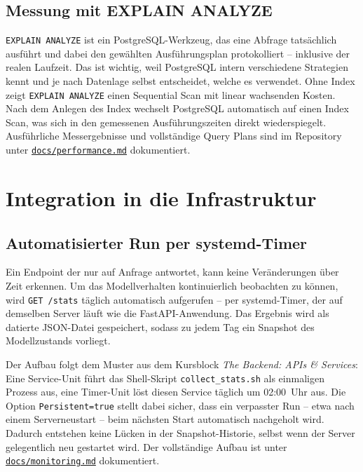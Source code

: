 \documentclass[12pt, a4paper]{article}
\newcommand{\repolink}[2]{\href{https://github.com/alinawagner1805-crypto/Full-Stack-Handwerk/#1}{#2}}
\begin{document}
\subsection{Messung mit EXPLAIN ANALYZE}

\texttt{EXPLAIN ANALYZE} ist ein PostgreSQL-Werkzeug, das eine Abfrage
tatsächlich ausführt und dabei den gewählten Ausführungsplan protokolliert
-- inklusive der realen Laufzeit. Das ist wichtig, weil PostgreSQL intern
verschiedene Strategien kennt und je nach Datenlage selbst entscheidet,
welche es verwendet. Ohne Index zeigt \texttt{EXPLAIN ANALYZE} einen
Sequential Scan mit linear wachsenden Kosten. Nach dem Anlegen des Index
wechselt PostgreSQL automatisch auf einen Index Scan, was sich in den
gemessenen Ausführungszeiten direkt wiederspiegelt. Ausführliche
Messergebnisse und vollständige Query Plans sind im Repository unter
\repolink{blob/main/docs/performance.md}{\texttt{docs/performance.md}}
dokumentiert.

\section{Integration in die Infrastruktur}

\subsection{Automatisierter Run per systemd-Timer}

Ein Endpoint der nur auf Anfrage antwortet, kann keine Veränderungen über
Zeit erkennen. Um das Modellverhalten kontinuierlich beobachten zu können,
wird \texttt{GET /stats} täglich automatisch aufgerufen -- per systemd-Timer,
der auf demselben Server läuft wie die FastAPI-Anwendung. Das Ergebnis wird
als datierte JSON-Datei gespeichert, sodass zu jedem Tag ein Snapshot des
Modellzustands vorliegt.

Der Aufbau folgt dem Muster aus dem Kursblock \textit{The Backend: APIs \&
Services}: Eine Service-Unit führt das Shell-Skript
\texttt{collect\_stats.sh} als einmaligen Prozess aus, eine Timer-Unit löst
diesen Service täglich um 02:00~Uhr aus. Die Option \texttt{Persistent=true}
stellt dabei sicher, dass ein verpasster Run -- etwa nach einem
Serverneustart -- beim nächsten Start automatisch nachgeholt wird. Dadurch
entstehen keine Lücken in der Snapshot-Historie, selbst wenn der Server
gelegentlich neu gestartet wird. Der vollständige Aufbau ist unter
\repolink{blob/main/docs/monitoring.md}{\texttt{docs/monitoring.md}}
dokumentiert.
\end{document}
